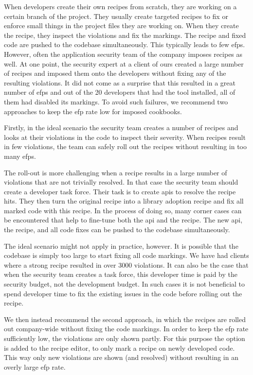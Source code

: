 When developers create their own recipes from scratch, they are working on a certain branch of the project.
They usually create targeted recipes to fix or enforce small things in the project files they are working on.
When they create the recipe, they inspect the violations and fix the markings.
The recipe and fixed code are pushed to the codebase simultaneously.
This typically leads to few \glspl{efp}.
However, often the application security team of the company imposes recipes as well.
At one point, the security expert at a client of ours created a large number of recipes and imposed them onto the developers without fixing any of the resulting violations.
It did not come as a surprise that this resulted in a great number of \glspl{efp} and out of the 20 developers that had the tool installed, all of them had disabled its markings.
To avoid such failures, we recommend two approaches to keep the \gls{efp} rate low for imposed cookbooks.

Firstly, in the ideal scenario the security team creates a number of recipes and looks at their violations in the code to inspect their severity.
When recipes result in few violations, the team can safely roll out the recipes without resulting in too many \glspl{efp}.

The roll-out is more challenging when a recipe results in a large number of violations that are not trivially resolved.
In that case the security team should create a developer task force.
Their task is to create \glspl{api} to resolve the recipe hits.
They then turn the original recipe into a library adoption recipe and fix all marked code with this recipe.
In the process of doing so, many corner cases can be encountered that help to fine-tune both the \gls{api} and the recipe.
The new \gls{api}, the recipe, and all code fixes can be pushed to the codebase simultaneously. 

The ideal scenario might not apply in practice, however.
It is possible that the codebase is simply too large to start fixing all code markings.
We have had clients where a strong recipe resulted in over 3000 violations.
It can also be the case that when the security team creates a task force, this developer time is paid by the security budget, not the development budget.
In such cases it is not beneficial to spend developer time to fix the existing issues in the code before rolling out the recipe. 

We then instead recommend the second approach, in which the recipes are rolled out company-wide without fixing the code markings.
In order to keep the \gls{efp} rate sufficiently low, the violations are only shown partly.
For this purpose the option is added to the recipe editor, to only mark a recipe on newly developed code.
This way only new violations are shown (and resolved) without resulting in an overly large \gls{efp} rate.